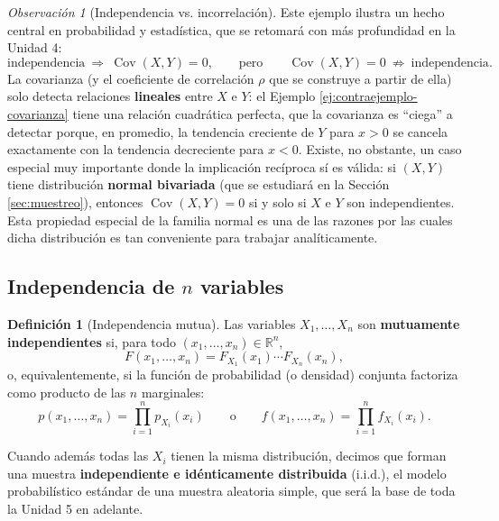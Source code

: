 \documentclass[11pt,a4paper]{article}
\theoremstyle{plain}
\theoremstyle{definition}
\newtheorem{definicion}[teorema]{Definición}
\theoremstyle{remark}
\newtheorem{observacion}[teorema]{Observación}
\begin{document}
\begin{observacion}[Independencia vs. incorrelación]
Este ejemplo ilustra un hecho central en probabilidad y estadística, que se retomará con más profundidad en la Unidad 4:
\[
\text{independencia} \ \Longrightarrow\ \operatorname{Cov}(X,Y)=0, \qquad\text{pero}\qquad \operatorname{Cov}(X,Y)=0 \ \not\Longrightarrow\ \text{independencia}.
\]
La covarianza (y el coeficiente de correlación $\rho$ que se construye a partir de ella) solo detecta relaciones \textbf{lineales} entre $X$ e $Y$: el Ejemplo \ref{ej:contraejemplo-covarianza} tiene una relación cuadrática perfecta, que la covarianza es ``ciega'' a detectar porque, en promedio, la tendencia creciente de $Y$ para $x>0$ se cancela exactamente con la tendencia decreciente para $x<0$. Existe, no obstante, un caso especial muy importante donde la implicación recíproca sí es válida: si $(X,Y)$ tiene distribución \textbf{normal bivariada} (que se estudiará en la Sección \ref{sec:muestreo}), entonces $\operatorname{Cov}(X,Y)=0$ si y solo si $X$ e $Y$ son independientes. Esta propiedad especial de la familia normal es una de las razones por las cuales dicha distribución es tan conveniente para trabajar analíticamente.
\end{observacion}

\subsection{Independencia de $n$ variables}

\begin{definicion}[Independencia mutua]
Las variables $X_1,\dots,X_n$ son \textbf{mutuamente independientes} si, para todo $(x_1,\dots,x_n)\in\mathbb R^n$,
\[
F(x_1,\dots,x_n) = F_{X_1}(x_1)\cdots F_{X_n}(x_n),
\]
o, equivalentemente, si la función de probabilidad (o densidad) conjunta factoriza como producto de las $n$ marginales:
\[
p(x_1,\dots,x_n) = \prod_{i=1}^n p_{X_i}(x_i) \qquad \text{o} \qquad f(x_1,\dots,x_n) = \prod_{i=1}^n f_{X_i}(x_i).
\]
\end{definicion}

Cuando además todas las $X_i$ tienen la misma distribución, decimos que forman una muestra \textbf{independiente e idénticamente distribuida} (i.i.d.), el modelo probabilístico estándar de una muestra aleatoria simple, que será la base de toda la Unidad 5 en adelante.
\end{document}
